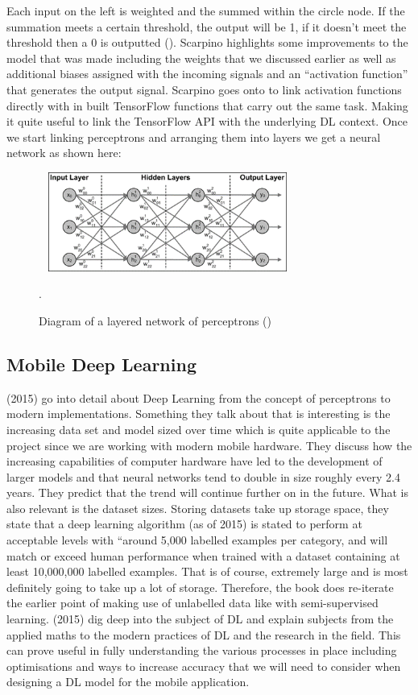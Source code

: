 \documentclass{article}
\begin{document}
Each input on the left is weighted and the summed within the circle node. If the summation meets a certain threshold, 
the output will be 1, if it doesn’t meet the threshold then a 0 is outputted (\cite{ScarpinoMatthew2018Tfd}). 
Scarpino highlights some 
improvements to the model that was made including the weights that we discussed earlier as well as additional biases 
assigned with the incoming signals and an “activation function” that generates the output signal. Scarpino goes onto to 
link activation functions directly with in built TensorFlow functions that carry out the same task. Making it quite 
useful to link the TensorFlow API with the underlying DL context. Once we start linking perceptrons and arranging them 
into layers we get a neural network as shown here:
\begin{figure}[h]\
    \centering
    \includegraphics[width=0.7\textwidth]{network.png}
    \caption{Diagram of a layered network of perceptrons (\cite{ScarpinoMatthew2018Tfd})}.
\end{figure}
\subsection{Mobile Deep Learning}
\citeauthor{goodfellow2016deep} (2015) go into detail about Deep Learning from the concept of perceptrons to modern 
implementations. Something they talk about that is interesting is the increasing data set and model sized over time 
which is quite applicable to the project since we are working with modern mobile hardware. They discuss how the 
increasing capabilities of computer hardware have led to the development of larger models and that neural networks tend 
to double in size roughly every 2.4 years. They predict that the trend will continue further on in the future. What is 
also relevant is the dataset sizes. Storing datasets take up storage space, they state that a deep learning algorithm 
(as of 2015) is stated to perform at acceptable levels with “around 5,000 labelled examples per category, and will match
 or exceed human performance when trained with a dataset containing at least 10,000,000 labelled examples. That is of 
 course, extremely large and is most definitely going to take up a lot of storage. Therefore, the book does re-iterate 
 the earlier point of making use of unlabelled data like with semi-supervised learning. \citeauthor{goodfellow2016deep}
  (2015) dig deep into the subject of DL and explain subjects from the applied maths to the modern practices of DL and 
  the research in the field. This can prove useful in fully understanding the various processes in place including 
  optimisations and ways to increase accuracy that we will need to consider when designing a DL model for the mobile 
  application.
\end{document}
